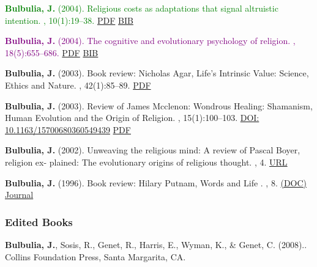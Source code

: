 \documentclass{article}
\begin{document}
\begin{thebibliography}{99}
 \textcolor{Green}{
{\bf Bulbulia, J.} (2004).
\newblock Religious costs as adaptations that signal altruistic intention.
, 10(1):19--38.}   \href{http://db.tt/BCahAsL}{PDF} \href{https://scholar.google.co.nz/scholar.bib?q=info:S_Eaz9FFNg4J:scholar.google.com/&output=citation&scisig=AAGBfm0AAAAAVQScQ3OHzAiiRCA0uahLpFkCTVIuvpok&scisf=4&hl=en}{BIB}


\textcolor{Purple}{{\bf Bulbulia, J.} (2004).
\newblock The cognitive and evolutionary psychology of religion.
, 18(5):655--686.} \href{http://db.tt/QyYditX}{PDF} \href{https://scholar.google.co.nz/scholar.bib?q=info:wfjh1TV9XQsJ:scholar.google.com/&output=citation&scisig=AAGBfm0AAAAAVQSiEyp4iOATTHZI5hVnJLq3P73FdO1P&scisf=4&hl=en}{BIB}


{\bf Bulbulia, J.} (2003).
\newblock Book review: Nicholas Agar, Life's Intrinsic Value: Science, Ethics and Nature.
, 42(1):85--89. \href{http://db.tt/o8XLYrL}{PDF}


{\bf Bulbulia, J.} (2003).
\newblock Review of {J}ames {M}cclenon: {W}ondrous Healing: Shamanism, Human
  Evolution and the Origin of Religion.
, 15(1):100--103. 
\href{https://doi.org/10.1163/15700680360549439}{DOI: 10.1163/15700680360549439} \href{http://db.tt/AO5Ut4S}{PDF}



{\bf Bulbulia, J.} (2002).
\newblock Unweaving the religious mind: A review of Pascal Boyer, religion ex-
  plained: The evolutionary origins of religious thought.
, 4. \href{http://www.arts.monash.edu.au/publications/eras/edition-4/bulbulia.php}{URL}


{\bf Bulbulia, J.} (1996).
\newblock Book review: {H}ilary {P}utnam, {W}ords and {L}ife .
, 8. \href{http://db.tt/vygRUWn}{(DOC)} \href{http://www.ptsem.edu/koinonia/}{Journal}



\subsubsection*{Edited Books} 



{\bf Bulbulia, J.}, Sosis, R., Genet, R., Harris, E., Wyman, K., \& Genet, C.
  (2008)..
\newblock Collins Foundation Press, Santa Margarita, CA. %



\end{thebibliography}
\end{document}
